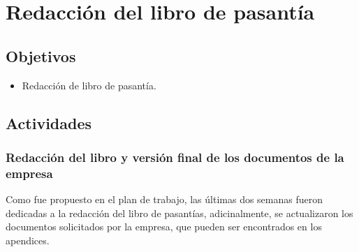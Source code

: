 
\section{Redacción del libro de pasantía} \label{sect:Redaccion del libro de pasantia}

\subsection{Objetivos}
\begin{itemize}[noitemsep,nolistsep]
\item Redacción de libro de pasantía. 
\end{itemize}

\subsection{Actividades}

\subsubsection{Redacción del libro y versión final de los documentos de la empresa}
\indent Como fue propuesto en el plan de trabajo, las últimas dos semanas fueron dedicadas a la redacción del libro de pasantías, adicinalmente, se actualizaron los documentos solicitados por la empresa, que pueden ser encontrados en los apendices.


